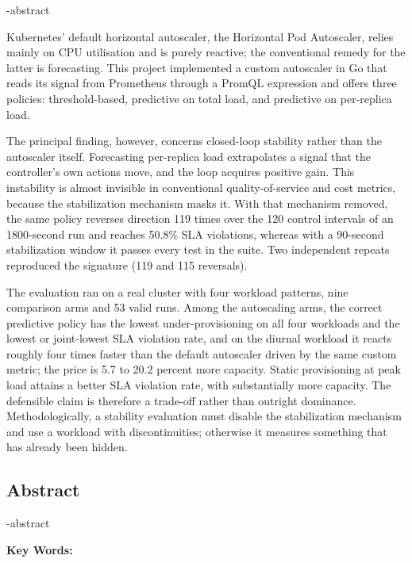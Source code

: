 
\en-abstract{
Kubernetes' default horizontal autoscaler, the Horizontal Pod Autoscaler, relies mainly
on CPU utilisation and is purely reactive; the conventional remedy for the latter is
forecasting. This project implemented a custom autoscaler in Go
that reads its signal from Prometheus through a PromQL expression and offers three
policies: threshold-based, predictive on total load, and predictive on per-replica load.

The principal finding, however, concerns closed-loop stability rather than the autoscaler
itself. Forecasting per-replica load extrapolates a signal that the controller's own
actions move, and the loop acquires positive gain. This
instability is almost invisible in conventional quality-of-service and cost metrics,
because the stabilization mechanism masks it. With that mechanism removed, the same policy
reverses direction 119 times over the 120 control intervals of an 1800-second run and
reaches 50.8\% SLA violations, whereas with a 90-second stabilization window it passes
every test in the suite. Two independent repeats reproduced the signature (119 and 115
reversals).

The evaluation ran on a real cluster with four workload patterns, nine comparison arms
and 53 valid runs. Among the autoscaling arms, the correct predictive policy has the lowest
under-provisioning on all four workloads and the lowest or joint-lowest SLA violation
rate, and on the diurnal workload it reacts roughly four times faster than the default
autoscaler driven by the same custom metric; the price is 5.7 to
20.2 percent more capacity. Static provisioning at peak load attains a better SLA
violation rate, with substantially more capacity. The defensible claim is therefore a
trade-off rather than outright dominance. Methodologically, a stability evaluation
must disable the stabilization mechanism and use a workload with discontinuities;
otherwise it measures something that has already been hidden.
}

\newpage
\thispagestyle{empty}
\begin{latin}
\section*{\LARGE\centering Abstract}

\een-abstract

\vspace*{.5cm}
{\large\textbf{Key Words:}}\par
\vspace*{.5cm}
\elatinkeywords
\end{latin}
